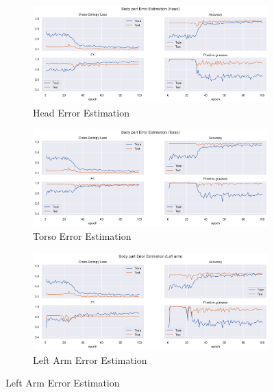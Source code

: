 \begin{figure}[ht]
  \centering
  \begin{subfigure}[b]{0.9\linewidth}
      \centering
      \includegraphics[width=\textwidth]{figures/Results/v1_bs_60_is_64_e_100/bp/Head_ErrorEstimation.png}
      \caption{Head Error Estimation}
      \label{fig:head_lb_ee}
  \end{subfigure}
  \hfill
  \begin{subfigure}[b]{0.9\linewidth}
      \centering
      \includegraphics[width=\textwidth]{figures/Results/v1_bs_60_is_64_e_100/bp/Torso_ErrorEstimation.png}
      \caption{Torso Error Estimation}
      \label{fig:torso_lb_ee}
  \end{subfigure}
  \hfill
  \begin{subfigure}[b]{0.9\linewidth}
      \centering
      \includegraphics[width=\textwidth]{figures/Results/v1_bs_60_is_64_e_100/bp/Left arm_ErrorEstimation.png}
      \caption{Left Arm Error Estimation}
      \label{fig:lear_lb_ee}
  \end{subfigure}
\end{figure}


